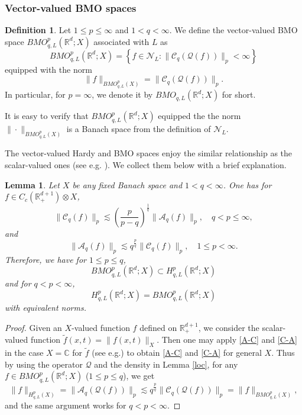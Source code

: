 \documentclass[oneside,english,a4wide]{amsart}
\numberwithin{equation}{section}
\numberwithin{figure}{section}
\theoremstyle{plain}
\theoremstyle{plain}
\theoremstyle{definition}
\theoremstyle{plain}
\newtheorem{lemma}[thm]{Lemma}
\theoremstyle{remark}
\theoremstyle{definition}
\newtheorem{definition}[thm]{Definition}
\theoremstyle{remark}
\theoremstyle{definition}
\newcommand{\real}{{\mathbb R}}
\newcommand{\A}{{\mathcal A}}
\newcommand{\N}{{\mathcal N}}
\newcommand{\Q}{{\mathcal Q}}
\newcommand{\8}{+\infty}
\renewcommand{\1}{\mathbbm{1}}
\newcommand{\wt}{\widetilde}
\newcommand\sk[1]{ \left( #1 \right) }
\newcommand\lk[1]{ \left\{ #1 \right\} }
\begin{document}
{%


\subsubsection{Vector-valued BMO spaces}
\begin{definition}
Let $1 \leq p \leq \infty$ and $1<q<\infty$. We define the vector-valued BMO space $BMO_{q,L}^p(\real^d; X)$ associated with $L$ as 
\[
    BMO_{q,L}^p(\real^d; X) = \lk{ f \in \N_L: \| \mathcal{C}_q(\Q(f)) \|_p < \infty }
\]
equipped with the norm
\[
    \| f \|_{BMO_{q,L}^p(X)} = \| \mathcal{C}_q(\Q(f)) \|_p.
\]
In particular, for $p = \infty$, we denote it by $BMO_{q, L}(\real^d; X)$ for short.
\end{definition}

It is easy to verify that $BMO^p_{q, L}(\real^d; X)$ equipped the the norm $\| \cdot \|_{BMO^p_{q, L}(X)}$ is a Banach space {from the definition of $\N_L$}.



The vector-valued Hardy and BMO spaces enjoy the similar relationship as the scalar-valued ones (see e.g. \cite{Coifman1985}). We collect them below with a brief explanation.

\begin{lemma}
Let $X$ be any fixed Banach space and $1<q<\infty$. One has for $f\in C_c(\real^{d+1}_+)\otimes X$, 
\begin{equation}\label{A-C}
    \| \mathcal{C}_{q}(f) \|_{p} \lesssim \sk{\frac{p}{p-q}}^{\frac{1}{q}} \| \A_{q}(f) \|_{p}, \quad q < p \leq \infty,
\end{equation}
and
\begin{equation}\label{C-A}
    \| \A_q(f) \|_p \lesssim q^{\frac{p}{q}} \| \mathcal{C}_q(f) \|_p, \quad 1 \leq p < \infty.
\end{equation} 
Therefore, we have for $1\leq p\leq q$, 
\[
    BMO_{q, L}^p(\real^d; X) \subset H^p_{q, L}(\real^d; X)
\]
and for $q < p < \infty$,
\[
    H^p_{q, L}(\real^d; X) = BMO_{q, L}^p(\real^d; X)
\]
with equivalent norms.
\end{lemma}

\begin{proof}
    Given an $X$-valued function $f$ defined on $\real^{d+1}_+$, we consider the scalar-valued function $ \wt{f}(x, t) = \| f(x, t) \|_X$. Then one may apply \eqref{A-C} and \eqref{C-A} in the case $X=\mathbb C$ for $\wt{f}$ (see e.g.\cite[Theorem 3]{Coifman1985}) to obtain \eqref{A-C} and \eqref{C-A} for general $X$. Thus by using the operator $\mathcal Q$ and the density in Lemma \ref{loc}, for any $f \in BMO_{q, L}^p(\real^d; X)$ ($1 \leq p \leq q$), we get
    \[
        \| f \|_{H^p_{q, L}(X)} = \| \A_q(\Q(f)) \|_p \lesssim q^{\frac{p}{q}}\| \mathcal{C}_q(\Q(f)) \|_p = \| f \|_{BMO_{q, L}^p(X)},
    \]
 and the same argument works for $q < p < \infty$.
\end{proof}




}
\end{document}
